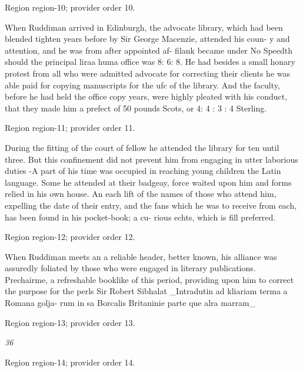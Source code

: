 \documentclass[11pt]{article}
\begin{document}
{\scriptsize\color{gray} Region region-10; provider order 10.\par}
\medskip

When Ruddiman arrived in Edinburgh, the advocate library, which had been blended tighten years before by Sir George Macenzie, attended his coun- y and attention, and he was from after appointed af- filank became under No Speedth should the principal liraa huma office was 8: 6: 8. He had besides a small honary protest from all who were admitted advocate for correcting their clients he was able paid for copying manuscripts for the ufc of the library. And the faculty, before he had held the office copy years, were highly pleated with his conduct, that they made him a prefect of 50 pounds Scots, or 4: 4 : 3 : 4 Sterling.
\par

{\scriptsize\color{gray} Region region-11; provider order 11.\par}
\medskip

During the fitting of the court of fellow he attended the library for ten until three. But this confinement did not prevent him from engaging in utter laborious duties -A part of his time was occupied in reaching young children the Latin language. Some he attended at their badgeay, force waited upon him and forms relied in his own house. An each lift of the names of those who attend him, expelling the date of their entry, and the fans which he was to receive from each, has been found in his pocket-book; a cu- rious echts, which is fill preferred.
\par

{\scriptsize\color{gray} Region region-12; provider order 12.\par}
\medskip

When Ruddiman meets an a reliable header, better known, his alliance was assuredly foliated by those who were engaged in literary publications. Prechairme, a refreshable booklike of this period, providing upon him to correct the purpose for the perls Sir Robert Sibhalat \_Intradutin ad kliariam terma a Romana golja- rum in sa Borcalis Britaninie parte que alra marram\_
\par

{\scriptsize\color{gray} Region region-13; provider order 13.\par}
\medskip

{\small\itshape 36\par}

{\scriptsize\color{gray} Region region-14; provider order 14.\par}
\medskip
\end{document}
